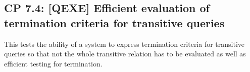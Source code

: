 

\subsection*{CP 7.4: [QEXE] Efficient evaluation of termination criteria for transitive queries}
\label{choke_point_7.4}
This tests the ability of a system to express termination criteria for transitive queries so that not the whole transitive relation has to be evaluated as well as efficient testing for termination.


